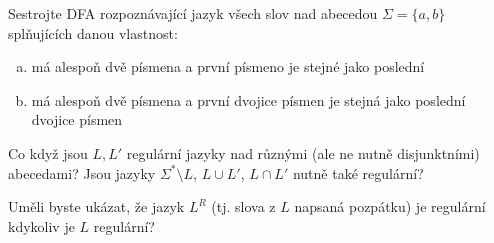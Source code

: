 \documentclass[a4paper,12pt]{amsart}
\begin{document}
\medskip\begin{problem}

    Sestrojte DFA rozpoznávající jazyk všech slov nad abecedou $\Sigma=\{a,b\}$ splňujících danou vlastnost:

    \medskip
    
    \begin{enumerate}[(a)]\setlength\itemsep{6pt}
        \item má alespoň dvě písmena a první písmeno je stejné jako poslední
        \item má alespoň dvě písmena a první dvojice písmen je stejná jako poslední dvojice písmen
    \end{enumerate}

\end{problem}


\medskip\begin{problem}

    Co když jsou $L,L'$ regulární jazyky nad různými (ale ne nutně disjunktními) abecedami? Jsou jazyky $\Sigma^*\setminus L$, $L\cup L'$, $L\cap L'$ nutně také regulární?

\end{problem}
  

\medskip\begin{problem}

    Uměli byste ukázat, že jazyk $L^R$ (tj. slova z $L$ napsaná pozpátku) je regulární kdykoliv je $L$ regulární?
      
\end{problem}
\end{document}
